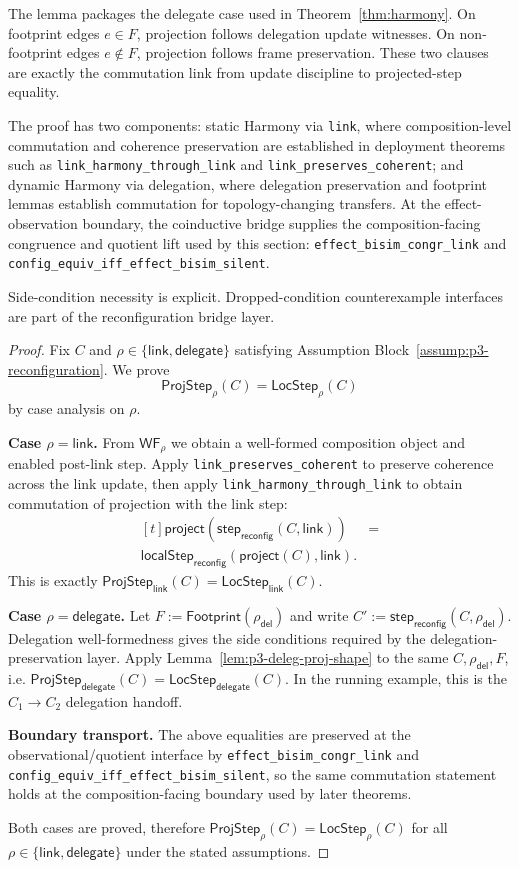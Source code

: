 \documentclass[a4paper,10pt,twocolumn,english]{article}
\numberwithin{equation}{section}
\theoremstyle{paperdef}
\theoremstyle{paperplain}
\theoremstyle{paperdef}
\theoremstyle{paperremark}
\theoremstyle{paperdef}
\newcommand{\ProjStep}[2]{\ensuremath{\mathsf{ProjStep}_{#2}(#1)}}
\newcommand{\LocStep}[2]{\ensuremath{\mathsf{LocStep}_{#2}(#1)}}
\begin{document}
The lemma packages the delegate case used in Theorem~\ref{thm:harmony}. On footprint edges $e\in F$, projection follows delegation update witnesses. On non-footprint edges $e\notin F$, projection follows frame preservation. These two clauses are exactly the commutation link from update discipline to projected-step equality.

The proof has two components: static Harmony via \texttt{link}, where composition-level commutation and coherence preservation are established in deployment theorems such as \nolinkurl{link_harmony_through_link} and \nolinkurl{link_preserves_coherent}; and dynamic Harmony via delegation, where delegation preservation and footprint lemmas establish commutation for topology-changing transfers. At the effect-observation boundary, the coinductive bridge supplies the composition-facing
congruence and quotient lift used by this section: \nolinkurl{effect_bisim_congr_link} and
\nolinkurl{config_equiv_iff_effect_bisim_silent}.

Side-condition necessity is explicit. Dropped-condition counterexample interfaces are part
of the reconfiguration bridge layer.

\begin{proof}
	Fix $C$ and $\rho\in\{\mathsf{link},\mathsf{delegate}\}$ satisfying
	Assumption Block~\ref{assump:p3-reconfiguration}. We prove
	\[
		\ProjStep{C}{\rho}=\LocStep{C}{\rho}
	\]
	by case analysis on $\rho$.

	\textbf{Case $\rho=\mathsf{link}$.}
	From $\mathsf{WF}_\rho$ we obtain a well-formed composition object and enabled post-link step.
	Apply \nolinkurl{link_preserves_coherent} to preserve coherence across the link update, then apply
	\nolinkurl{link_harmony_through_link} to obtain commutation of projection with the link step:
	\[
		\begin{aligned}[t]
			\mathsf{project}(\mathsf{step}_{\mathsf{reconfig}}(C,\mathsf{link}))
			 & = \\
			\mathsf{localStep}_{\mathsf{reconfig}}(\mathsf{project}(C),\mathsf{link}).
		\end{aligned}
	\]
	This is exactly $\ProjStep{C}{\mathsf{link}}=\LocStep{C}{\mathsf{link}}$.

	\textbf{Case $\rho=\mathsf{delegate}$.}
	Let $F:=\mathsf{Footprint}(\rho_{\mathsf{del}})$ and write
	$C':=\mathsf{step}_{\mathsf{reconfig}}(C,\rho_{\mathsf{del}})$.
	Delegation well-formedness gives the side conditions required by the delegation-preservation layer.
	Apply Lemma~\ref{lem:p3-deleg-proj-shape} to the same $C,\rho_{\mathsf{del}},F$,
	i.e. $\ProjStep{C}{\mathsf{delegate}}=\LocStep{C}{\mathsf{delegate}}$.
	In the running example, this is the $C_1 \to C_2$ delegation handoff.

	\textbf{Boundary transport.}
	The above equalities are preserved at the observational/quotient interface by
	\nolinkurl{effect_bisim_congr_link} and
	\nolinkurl{config_equiv_iff_effect_bisim_silent}, so the same commutation statement holds at the
	composition-facing boundary used by later theorems.

	Both cases are proved, therefore $\ProjStep{C}{\rho}=\LocStep{C}{\rho}$ for all
	$\rho\in\{\mathsf{link},\mathsf{delegate}\}$ under the stated assumptions.
\end{proof}
\end{document}
